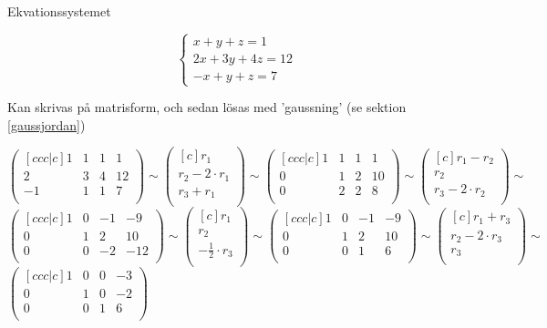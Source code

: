 \documentclass[../../main.tex]{subfiles}
\begin{document}
\begin{solution}{7}

Ekvationssystemet

$$
\begin{cases}
x + y + z = 1\\
2x + 3y + 4z = 12\\
-x + y + z = 7
\end{cases}
$$

Kan skrivas på matrisform, och sedan lösas med 'gaussning' (se sektion \ref{gaussjordan})

$$
\begin{pmatrix}[ccc|c]
  1 & 1 & 1 & 1\\
  2 & 3 & 4 & 12\\
  -1 & 1 & 1 & 7\\
\end{pmatrix} 
\sim 
\begin{pmatrix}[c]
  r_1\\
  r_2 - 2\cdot r_1\\
  r_3 + r_1\\
\end{pmatrix}
\sim 
\begin{pmatrix}[ccc|c]
  1 & 1 & 1 & 1\\
  0 & 1 & 2 & 10\\
  0 & 2 & 2 & 8\\
\end{pmatrix} 
\sim 
\begin{pmatrix}[c]
  r_1 - r_2\\
  r_2\\
  r_3 - 2\cdot r_2\\
\end{pmatrix}
\sim 
$$
$$
\begin{pmatrix}[ccc|c]
  1 & 0 & -1 & -9\\
  0 & 1 & 2 & 10\\
  0 & 0 & -2 & -12\\
\end{pmatrix} 
\sim 
\begin{pmatrix}[c]
  r_1\\
  r_2\\
  -\frac{1}{2} \cdot r_3\\
\end{pmatrix}
\sim 
\begin{pmatrix}[ccc|c]
  1 & 0 & -1 & -9\\
  0 & 1 & 2 & 10\\
  0 & 0 & 1 & 6\\
\end{pmatrix} 
\sim 
\begin{pmatrix}[c]
  r_1 + r_3\\
  r_2 - 2\cdot r_3\\
  r_3\\
\end{pmatrix}
\sim 
$$
$
\begin{pmatrix}[ccc|c]
  1 & 0 & 0 & -3\\
  0 & 1 & 0 & -2\\
  0 & 0 & 1 & 6\\
\end{pmatrix} 
$


\end{solution}
\end{document}
